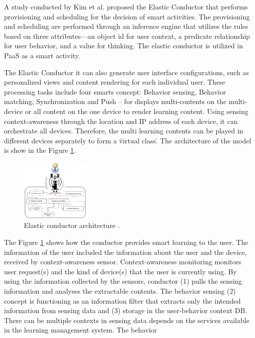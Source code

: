 \documentclass[journal]{vgtc}                %
\begin{document}
  A study conducted by Kim et al. \cite{Kim2013} proposed the Elastic Conductor that performs provisioning and scheduling for the decision of smart activities. The provisioning and scheduling are performed through an inference engine that utilizes the rules based on three attributes—an object id for user context, a predicate relationship for user behavior, and a value for thinking. The elastic conductor is utilized in PaaS as a smart activity.
  
  The Elastic Conductor it can also generate user interface configurations, such as personalized views and content rendering for each individual user. These processing tasks include four smarts concept: Behavior sensing, Behavior matching, Synchronization and Push – for displays multi-contents on the multi-device or all content on the one device to render learning content. Using sensing context-awareness through the location and IP address of each device, it can orchestrate all devices. Therefore, the multi learning contents can be played in different devices separately to form a \"virtual class\". The architecture of the model is show in the Figure \ref{elastic-conductor}.

  \begin{figure}[htb]
    \centering
    \includegraphics[width=0.3\textwidth]{elastic-conductor}
    \caption{Elastic conductor architecture \cite{Kim2013}.}
    \label{elastic-conductor}
  \end{figure}

  The Figure \ref{elastic-conductor} shows how the conductor provides smart learning to the user. The information of the user included the information about the user and the device, received by context-awareness sensor. Context-awareness monitoring monitors user request(s) and the kind of device(s) that the user is currently using. By using the information collected by the sensors, conductor (1) pulls the sensing information and analyses the extractable contents. The behavior sensing (2) concept is functioning as an information filter that extracts only the intended information from sensing data and (3) storage in the user-behavior context DB. There can be multiple contexts in sensing data depends on the services available in the learning management system. The behavior
\end{document}
